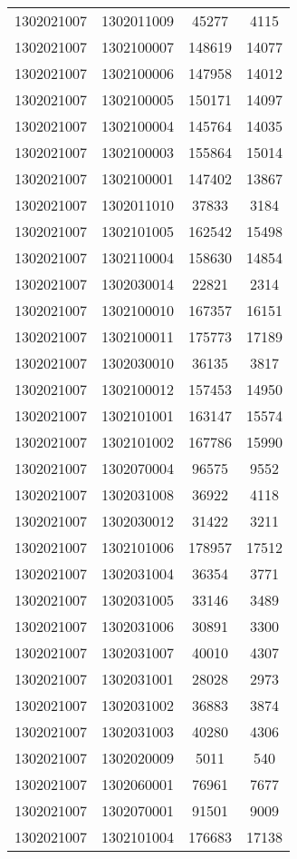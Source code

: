 \begin{longtable}[h]{llcc}
		1302021007 & 1302011009 & 45277 & 4115\\
		1302021007 & 1302100007 & 148619 & 14077\\
		1302021007 & 1302100006 & 147958 & 14012\\
		1302021007 & 1302100005 & 150171 & 14097\\
		1302021007 & 1302100004 & 145764 & 14035\\
		1302021007 & 1302100003 & 155864 & 15014\\
		1302021007 & 1302100001 & 147402 & 13867\\
		1302021007 & 1302011010 & 37833 & 3184\\
		1302021007 & 1302101005 & 162542 & 15498\\
		1302021007 & 1302110004 & 158630 & 14854\\
		1302021007 & 1302030014 & 22821 & 2314\\
		1302021007 & 1302100010 & 167357 & 16151\\
		1302021007 & 1302100011 & 175773 & 17189\\
		1302021007 & 1302030010 & 36135 & 3817\\
		1302021007 & 1302100012 & 157453 & 14950\\
		1302021007 & 1302101001 & 163147 & 15574\\
		1302021007 & 1302101002 & 167786 & 15990\\
		1302021007 & 1302070004 & 96575 & 9552\\
		1302021007 & 1302031008 & 36922 & 4118\\
		1302021007 & 1302030012 & 31422 & 3211\\
		1302021007 & 1302101006 & 178957 & 17512\\
		1302021007 & 1302031004 & 36354 & 3771\\
		1302021007 & 1302031005 & 33146 & 3489\\
		1302021007 & 1302031006 & 30891 & 3300\\
		1302021007 & 1302031007 & 40010 & 4307\\
		1302021007 & 1302031001 & 28028 & 2973\\
		1302021007 & 1302031002 & 36883 & 3874\\
		1302021007 & 1302031003 & 40280 & 4306\\
		1302021007 & 1302020009 & 5011 & 540\\
		1302021007 & 1302060001 & 76961 & 7677\\
		1302021007 & 1302070001 & 91501 & 9009\\
		1302021007 & 1302101004 & 176683 & 17138\\

\end{longtable}
